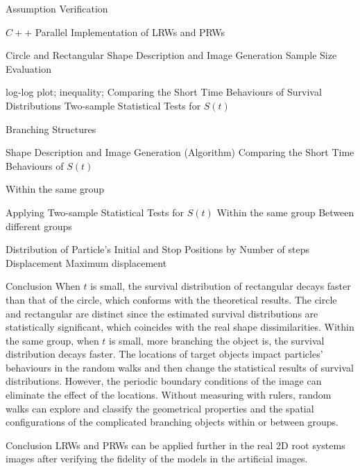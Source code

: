 \documentclass{article}
\begin{document}
\begin{outline}[enumerate]
          
    \1 Assumption Verification
       \par
       $C++$ Parallel Implementation of LRWs and PRWs

       \2 Circle and Rectangular
         \3 Shape Description and Image Generation
         \3 Sample Size Evaluation
           \par
            log-log plot; inequality; 
         \3 Comparing the Short Time Behaviours of Survival Distributions
         \3 Two-sample Statistical Tests for $S(t)$

      \2 Branching Structures
         
         \3 Shape Description and Image Generation (Algorithm)
         \3 Comparing the Short Time Behaviours of $S(t)$
            \par
            Within the same group

         \3 Applying Two-sample Statistical Tests for $S(t)$
            \4 Within the same group
            \4 Between different groups
            
         \3 Distribution of Particle's Initial and Stop Positions by
            \4 Number of steps
            \4 Displacement
            \4 Maximum displacement

      \2 Conclusion
        \3 When $t$ is small, the survival distribution of rectangular decays faster than that of the circle, which conforms with the theoretical results.
        \3 The circle and rectangular are distinct since the estimated survival distributions are statistically significant, which coincides with the real shape dissimilarities.
        \3 Within the same group, when $t$ is small, more branching the object is, the survival distribution decays faster.
        \3 The locations of target objects impact particles' behaviours in the random walks and then change the statistical results of survival distributions. However, the periodic boundary conditions of the image can eliminate the effect of the locations.
        \3 Without measuring with rulers, random walks can explore and classify the geometrical properties and the spatial configurations of the complicated branching objects within or between groups.  
          

   \1 Conclusion
     \2 LRWs and PRWs can be applied further in the real 2D root systems images after verifying the fidelity of the models in the artificial images.
    

\end{outline}

\newpage

\printbibliography
\end{document}
